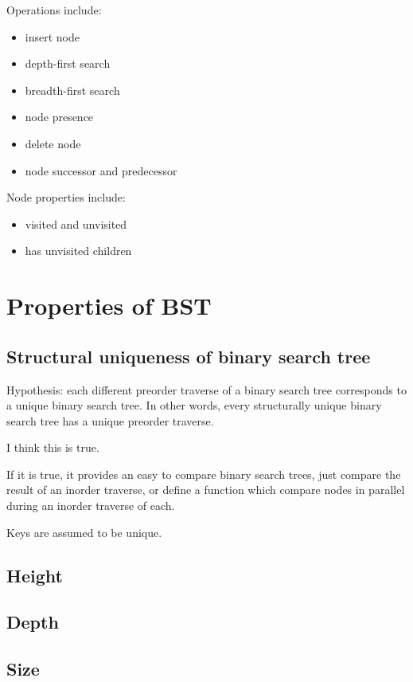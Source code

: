 \documentclass{article}
\begin{document}
Operations include:

\begin{itemize}
\item insert node
\item depth-first search
\item breadth-first search
\item node presence
\item delete node
\item node successor and predecessor
\end{itemize}

Node properties include:

\begin{itemize}
  \item visited and unvisited
  \item has unvisited children
\end{itemize}

\section{Properties of BST}

\subsection{Structural uniqueness of binary search tree}

Hypothesis: each different preorder traverse of a binary search
tree corresponds to a unique binary search tree. In other words,
every structurally unique binary search
tree has a unique preorder traverse.

I think this is true.

If it is true, it provides an easy to compare binary
search trees, just compare the result of an inorder
traverse, or define a function which compare nodes in
parallel during an inorder traverse of each.

Keys are assumed to be unique.

\subsection{Height}

\subsection{Depth}

\subsection{Size}
\end{document}
